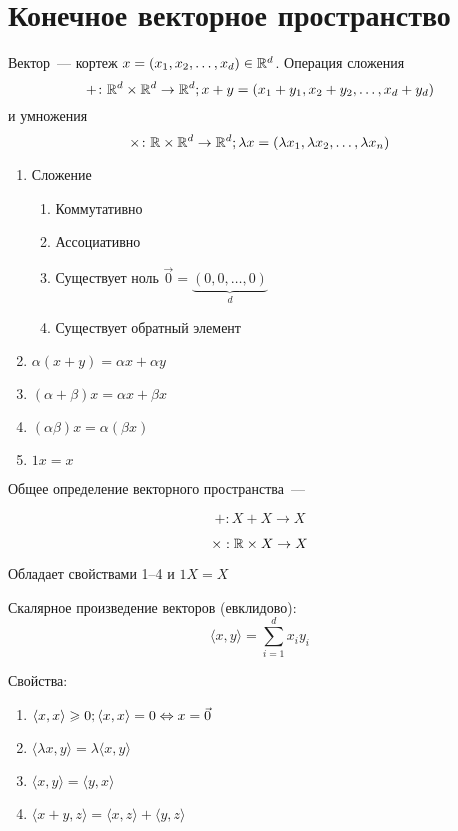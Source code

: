\section{Конечное векторное пространство}

\begin{Def}
Вектор~--- кортеж $x = (x_1, x_2, \ldots, x_d) \in \mathbb{R}^d$. Операция сложения 
$$+\colon \mathbb{R}^d \times \mathbb{R}^d \rightarrow \mathbb{R}^d;x+y = (x_1+y_1, x_2+y_2, \ldots, x_d + y_d)$$ 
и умножения 
$$\times\colon \mathbb{R} \times \mathbb{R}^d \rightarrow \mathbb{R}^d; \lambda x = (\lambda x_1, \lambda x_2, \ldots, \lambda x_n)$$
\end{Def}
\begin{enumerate}
\item Сложение
\begin{enumerate}
\item Коммутативно
\item Ассоциативно
\item Существует ноль $\vec 0 = \underbrace{(0, 0, \ldots, 0)}_d$
\item Существует обратный элемент
\end{enumerate}
\item $\alpha (x + y) = \alpha x + \alpha y$
\item $(\alpha + \beta) x = \alpha x + \beta x$
\item $(\alpha\beta)x = \alpha(\beta x)$
\item $1x = x$
\end{enumerate}
\begin{Def}
Общее определение векторного пространства~--- 

$$+: X + X \to X$$

$$\times: \mathbb{R} \times X \to X$$

Обладает свойствами 1--4 и $1X = X$ 
\end{Def}

\begin{Def}
Скалярное произведение векторов (евклидово):
$$\langle x, y\rangle = \sum_{i=1}^d x_iy_i$$
\end{Def}
Свойства:~%
\begin{enumerate}
\item $\langle x, x\rangle \geqslant 0; \langle x, x\rangle = 0 \Leftrightarrow x = \vec 0$
\item $\langle \lambda x, y\rangle = \lambda \langle x, y\rangle$
\item $\langle x, y\rangle = \langle y, x\rangle$
\item $\langle x + y, z\rangle = \langle x, z\rangle + \langle y, z\rangle$
\end{enumerate}

